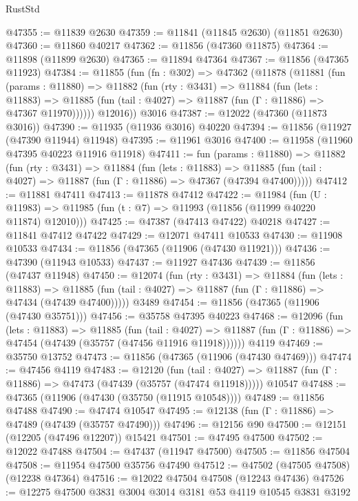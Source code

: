 \begin{lexlean}{RustStd}
\begin{coremodule}
@47355 := @11839 @2630
@47359 := @11841 (@11845 @2630) (@11851 @2630)
@47360 := @11860 @40217
@47362 := @11856 (@47360 @11875)
@47364 := @11898 (@11899 @2630)
@47365 := @11894 @47364
@47367 := @11856 (@47365 @11923)
@47384 := @11855
    (fun (fn : @302) =>
    @47362
      (@11878
        (@11881
          (fun (params : @11880) =>
          @11882
            (fun (rty : @3431) =>
            @11884
              (fun (lets : @11883) =>
              @11885 (fun (tail : @4027) => @11887 (fun (Γ : @11886) => @47367 @11970))))))
        @12016))
    @3016
@47387 := @12022 (@47360 (@11873 @3016))
@47390 := @11935 (@11936 @3016) @40220
@47394 := @11856 (@11927 (@47390 @11944) @11948)
@47395 := @11961 @3016
@47400 := @11958 (@11960 @47395 @40223 @11916 @11918)
@47411 := fun (params : @11880) =>
  @11882
    (fun (rty : @3431) =>
    @11884
      (fun (lets : @11883) =>
      @11885 (fun (tail : @4027) => @11887 (fun (Γ : @11886) => @47367 (@47394 @47400)))))
@47412 := @11881 @47411
@47413 := @11878 @47412
@47422 := @11984
    (fun (U : @11983) => @11985 (fun (t : @7) => @11993 (@11856 (@11999 @40220 @11874) @12010)))
@47425 := @47387 (@47413 @47422) @40218
@47427 := @11841 @47412 @47422
@47429 := @12071 @47411 @10533
@47430 := @11908 @10533
@47434 := @11856 (@47365 (@11906 (@47430 @11921)))
@47436 := @47390 (@11943 @10533)
@47437 := @11927 @47436
@47439 := @11856 (@47437 @11948)
@47450 := @12074
    (fun (rty : @3431) =>
    @11884
      (fun (lets : @11883) =>
      @11885 (fun (tail : @4027) => @11887 (fun (Γ : @11886) => @47434 (@47439 @47400)))))
    @3489
@47454 := @11856 (@47365 (@11906 (@47430 @35751)))
@47456 := @35758 @47395 @40223
@47468 := @12096
    (fun (lets : @11883) =>
    @11885
      (fun (tail : @4027) =>
      @11887 (fun (Γ : @11886) => @47454 (@47439 (@35757 (@47456 @11916 @11918))))))
    @4119
@47469 := @35750 @13752
@47473 := @11856 (@47365 (@11906 (@47430 @47469)))
@47474 := @47456 @4119
@47483 := @12120
    (fun (tail : @4027) => @11887 (fun (Γ : @11886) => @47473 (@47439 (@35757 (@47474 @11918)))))
    @10547
@47488 := @47365 (@11906 (@47430 (@35750 (@11915 @10548))))
@47489 := @11856 @47488
@47490 := @47474 @10547
@47495 := @12138 (fun (Γ : @11886) => @47489 (@47439 (@35757 @47490)))
@47496 := @12156 @90
@47500 := @12151 (@12205 (@47496 @12207)) @15421
@47501 := @47495 @47500
@47502 := @12022 @47488
@47504 := @47437 (@11947 @47500)
@47505 := @11856 @47504
@47508 := @11954 @47500 @35756 @47490
@47512 := @47502 (@47505 @47508) (@12238 @47364)
@47516 := @12022 @47504 @47508 (@12243 @47436)
@47526 := @12275 @47500 @3831 @3004 @3014 @3181 @53 @4119 @10545 @3831 @3192

\end{coremodule}
\end{lexlean}
